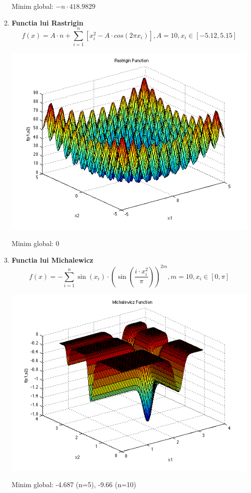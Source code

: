 \documentclass{article}
\begin{document}
\begin{enumerate}
Minim global: $-n \cdot 418.9829$
\item \textbf{Functia lui Rastrigin}
$$ f(x) = A \cdot n + \sum_{i=1}^n \left[ x_i^2 - A \cdot cos(2 \pi x_i) \right],
A = 10, x_i \in \left[ -5.12, 5.15 \right]$$

\includegraphics[scale=0.5]{rastr.png}

Minim global: 0
\item \textbf{Functia lui Michalewicz}
$$ f(x) = -\sum_{i=1}^n \sin (x_i) \cdot \left( \sin \left( \frac{i \cdot x_i^{2}}{\pi} \right) \right)  ^{2m},
m = 10, x_i \in \left[ 0, \pi \right] $$

\includegraphics[scale=0.5]{michal.png}

Minim global: -4.687 (n=5), -9.66 (n=10)
\end{enumerate}
\end{document}
